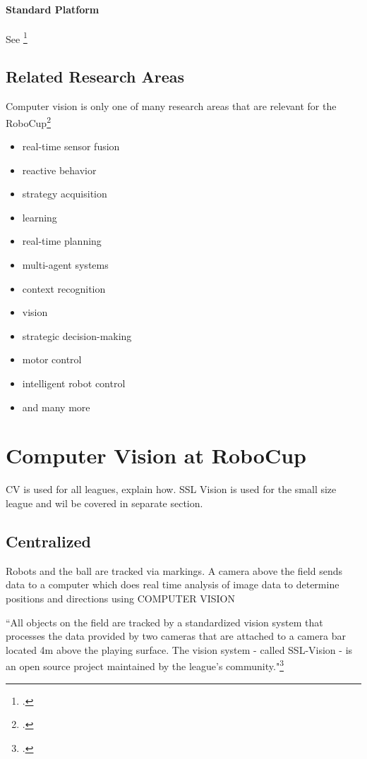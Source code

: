 \paragraph{Standard Platform} See \footcite[Cf.][]{robo_std_wiki}



\subsection{Related Research Areas \label{sec:robo-research}}
Computer vision is only one of many research areas that are relevant for the
RoboCup\footcite[Cf.][]{robo_objectives}
\begin{itemize}
  \item real-time sensor fusion
  \item reactive behavior
  \item strategy acquisition
  \item learning
  \item real-time planning
  \item multi-agent systems
  \item context recognition
  \item vision
  \item strategic decision-making
  \item motor control
  \item intelligent robot control
  \item and many more
\end{itemize}




\newpage
\section{Computer Vision at RoboCup \label{sec:cv-robo}}

CV is used for all leagues, explain how.
SSL Vision is used for the small size league and wil be covered in separate
section.

\subsection{Centralized}
Robots and the ball are tracked via markings. A camera above the field sends
data to a computer which does real time analysis of image data to determine
positions and directions using COMPUTER VISION

``All objects on the field are tracked by a standardized vision system that
processes the data provided by two cameras that are attached to a camera bar
located 4m above the playing surface. The vision system - called SSL-Vision - is
an open source project maintained by the league's community."\footcite[Cf.][]{robo_ssl_wiki}

